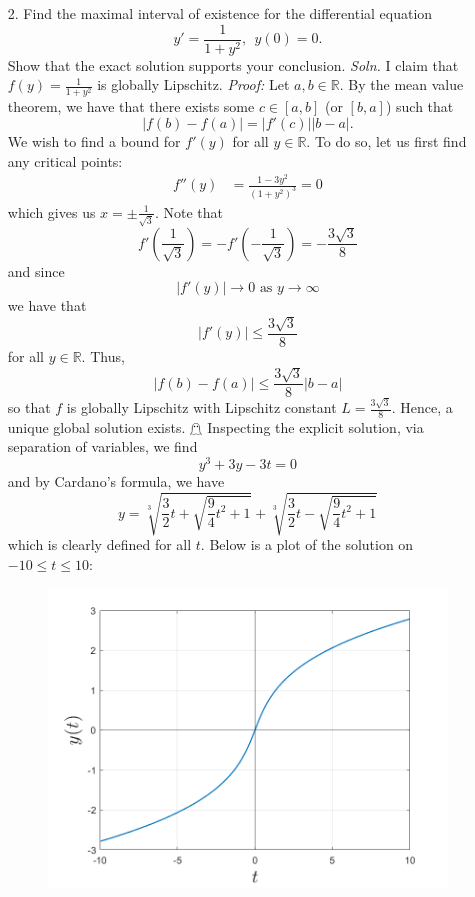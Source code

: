 \documentclass{article}
\begin{document}
\begin{itemize}
    \item[2.] Find the maximal interval of existence for the differential equation
    \[y' = \frac{1}{1 + y^2}, \:\: y(0) = 0.\]
    Show that the exact solution supports your conclusion.
    \newline\newline
    \textit{Soln.} I claim that $f(y) = \frac{1}{1 + y^2}$ is globally Lipschitz. 
    \newline\newline
    \textit{Proof:} Let $a,b \in \mathbb{R}$. By the mean value theorem, we have that there exists some $c \in [a,b]$ (or $[b,a]$) such that
    \[|f(b) - f(a)| = |f'(c)||b - a|.\]
    We wish to find a bound for $f'(y)$ for all $y \in \mathbb{R}$. To do so, let us first find any critical points:
    \begin{align*}
        f''(y) &= \frac{1 - 3y^2}{(1 + y^2)^3} = 0
    \end{align*}
    which gives us $x = \pm \frac{1}{\sqrt{3}}$. Note that 
    \[f'\left(\frac{1}{\sqrt{3}}\right) = -f'\left(-\frac{1}{\sqrt{3}}\right) = -\frac{3\sqrt{3}}{8}\]
    and since 
    \[|f'(y)| \to 0 \text{  as  } y \to \infty\]
    we have that 
    \[|f'(y)| \leq \frac{3\sqrt{3}}{8}\]
    for all $y \in \mathbb{R}$. Thus,
    \[|f(b) - f(a)| \leq \frac{3\sqrt{3}}{8}|b - a|\]
    so that $f$ is globally Lipschitz with Lipschitz constant $L = \frac{3\sqrt{3}}{8}$. Hence, a unique global solution exists. \hfill $\mathghost$
    \newline\newline
    Inspecting the explicit solution, via separation of variables, we find
    \[y^3 + 3y - 3t = 0\]
    and by Cardano's formula, we have
    \[y = \sqrt[3]{\frac{3}{2}t + \sqrt{\frac{9}{4}t^2 + 1}} + \sqrt[3]{\frac{3}{2}t - \sqrt{\frac{9}{4}t^2 + 1}}\]
    which is clearly defined for all $t$. Below is a plot of the solution on $-10 \leq t \leq 10$:
    \begin{figure}[H]
        \centering
        \includegraphics[scale = 0.3]{sampleSoln.png}
    \end{figure}
    
    
\end{itemize}
\end{document}
